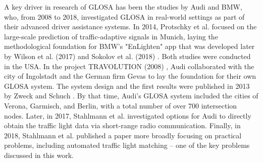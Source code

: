 A key driver in research of GLOSA has been the studies by Audi and BMW, who, from 2008 to 2018, investigated GLOSA in real-world settings as part of their advanced driver assistance systems. In 2014, Protschky et al. \cite{protschky_extensive_2014, protschky_adaptive_2014} focused on the large-scale prediction of traffic-adaptive signals in Munich, laying the methodological foundation for BMW's "EnLighten" app that was developed later by Wilson et al. (2017) \cite{wilson_driver_2017} and Sokolov et al. (2018) \cite{sokolov_effects_2018}. Both studies were conducted in the USA. In the project TRAVOLUTION (2008) \cite{braun_travolution-netzweite_2009}, Audi collaborated with the city of Ingolstadt and the German firm Gevas to lay the foundation for their own GLOSA system. The system design and the first results were published in 2013 by Zweck and Schuch \cite{zweck_traffic_2013}. By that time, Audi's GLOSA system included the cities of Verona, Garmisch, and Berlin, with a total number of over 700 intersection nodes. Later, in 2017, Stahlmann et al. \cite{stahlmann_multi-hop_2017} investigated options for Audi to directly obtain the traffic light data via short-range radio communication. Finally, in 2018, Stahlmann et al. \cite{stahlmann_exploring_2018} published a paper more broadly focusing on practical problems, including automated traffic light matching -- one of the key problems discussed in this work.

